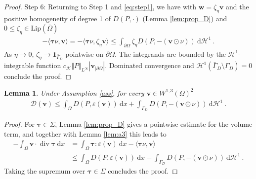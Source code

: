 \documentclass{article}
\newtheorem{lemma}[theorem]{Lemma}
\theoremstyle{definition}
\newcommand{\bfv}{\boldsymbol{v}}
\newcommand{\bfw}{\boldsymbol{w}}
\newcommand{\bftau}{\boldsymbol{\tau}}
\newcommand{\K}{\mathcal{K}}
\newcommand{\D}{\mathcal{D}}
\newcommand{\dd}{\:\mathrm{d}}
\renewcommand\div{\operatorname{\mathrm{div}}}
\begin{document}
\begin{proof}
    Step 6:
    Returning to Step 1 and \eqref{eq:step1}, we have with $\bfw = \zeta_\eta\bfv$ and the positive homogeneity
    of degree 1 of $D(P,\cdot)$ (Lemma \ref{lem:prop_D}) and $0\leq\zeta_\eta\in\mathrm{Lip}(\bar\Omega)$
    \begin{align*}
        -\langle \bftau\nu, \bfv\rangle = - \langle \bftau\nu, \zeta_\eta \bfv\rangle
        \leq \int_{\partial\Omega} \zeta_\eta D(P, -(\bfv\odot \nu)) \dd \mathcal{H}^1 \ .
    \end{align*}
    As $\eta\rightarrow 0$, $\zeta_\eta \rightarrow \mathbf 1_{\bar\Gamma_D}$ pointwise on $\partial\Omega$.
    The integrands are bounded by the $\mathcal{H}^{1}$-integrable function
    $c_\K \Vert P\Vert_{L^{\infty}}|\bfv_{|\partial\Omega}|$.
    Dominated convergence and $\mathcal{H}^{1}(\bar\Gamma_D\setminus\Gamma_D) =0$ conclude the proof.
\end{proof}
\begin{lemma} \label{lem:prove_leq}
    Under Assumption \ref{ass}, for every $\bfv \in W^{1,3}(\Omega)^2$
    \begin{align*}
        \D(\bfv) \leq \int_\Omega D(P,\varepsilon(\bfv)) \dd x + \int_{\Gamma_D} D(P, -(\bfv\odot \nu) ) \dd \mathcal{H}^1 \ .
    \end{align*}
\end{lemma}
\begin{proof}
    For $\bftau \in \Sigma$, Lemma \ref{lem:prop_D} gives a pointwise estimate for the volume term,
    and together with Lemma \ref{lem:a3} this leads to
    \begin{align*}
        - \int_\Omega \bfv \cdot \div \bftau \dd x &= \int_\Omega \bftau : \varepsilon(\bfv) \dd x
        - \langle \bftau\nu, \bfv \rangle\\
        &\leq \int_\Omega D(P, \varepsilon(\bfv)) \dd x
        +\int_{\Gamma_D} D(P, -(\bfv\odot \nu) ) \dd \mathcal{H}^{1} \ .
    \end{align*}
    Taking the supremum over $\bftau\in \Sigma$ concludes the proof.
\end{proof}

\end{document}
